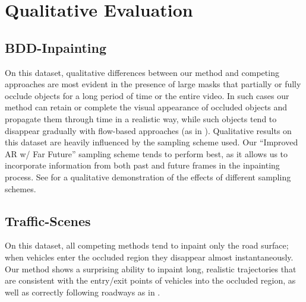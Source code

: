 \section{Qualitative Evaluation}
\subsection{BDD-Inpainting}
On this dataset, qualitative differences between our method and competing approaches are most evident in the presence of large masks that partially or fully occlude objects for a long period of time or the entire video. In such cases our method can retain or complete the visual appearance of occluded objects and propagate them through time in a realistic way, while such objects tend to disappear gradually with flow-based approaches (as in ). Qualitative results on this dataset are heavily influenced by the sampling scheme used. Our ``Improved AR w/ Far Future'' sampling scheme tends to perform best, as it allows us to incorporate information from both past and future frames in the inpainting process. See  for a qualitative demonstration of the effects of different sampling schemes. 
\subsection{Traffic-Scenes} On this dataset, all competing methods tend to inpaint only the road surface; when vehicles enter the occluded region they disappear almost instantaneously. Our method shows a surprising ability to inpaint long, realistic trajectories that are consistent with the entry/exit points of vehicles into the occluded region, as well as correctly following roadways as in . %
